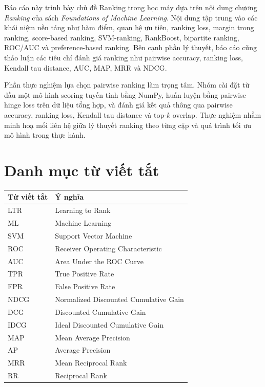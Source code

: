 \documentclass[12pt,a4paper]{article}
\begin{document}
Báo cáo này trình bày chủ đề Ranking trong học máy dựa trên nội dung chương 	\textit{Ranking} của sách 	\textit{Foundations of Machine Learning}. Nội dung tập trung vào các khái niệm nền tảng như hàm điểm, quan hệ ưu tiên, ranking loss, margin trong ranking, score-based ranking, SVM-ranking, RankBoost, bipartite ranking, ROC/AUC và preference-based ranking. Bên cạnh phần lý thuyết, báo cáo cũng thảo luận các tiêu chí đánh giá ranking như pairwise accuracy, ranking loss, Kendall tau distance, AUC, MAP, MRR và NDCG.

Phần thực nghiệm lựa chọn pairwise ranking làm trọng tâm. Nhóm cài đặt từ đầu một mô hình scoring tuyến tính bằng NumPy, huấn luyện bằng pairwise hinge loss trên dữ liệu tổng hợp, và đánh giá kết quả thông qua pairwise accuracy, ranking loss, Kendall tau distance và top-\(k\) overlap. Thực nghiệm nhằm minh hoạ mối liên hệ giữa lý thuyết ranking theo từng cặp và quá trình tối ưu mô hình trong thực hành.

\newpage

\tableofcontents
\newpage

\section*{Danh mục từ viết tắt}

\begin{center}
\begin{tabular}{ll}
\toprule
\textbf{Từ viết tắt} & \textbf{Ý nghĩa} \\
\midrule
LTR & Learning to Rank \\
ML & Machine Learning \\
SVM & Support Vector Machine \\
ROC & Receiver Operating Characteristic \\
AUC & Area Under the ROC Curve \\
TPR & True Positive Rate \\
FPR & False Positive Rate \\
NDCG & Normalized Discounted Cumulative Gain \\
DCG & Discounted Cumulative Gain \\
IDCG & Ideal Discounted Cumulative Gain \\
MAP & Mean Average Precision \\
AP & Average Precision \\
MRR & Mean Reciprocal Rank \\
RR & Reciprocal Rank \\
\bottomrule
\end{tabular}
\end{center}
\end{document}

